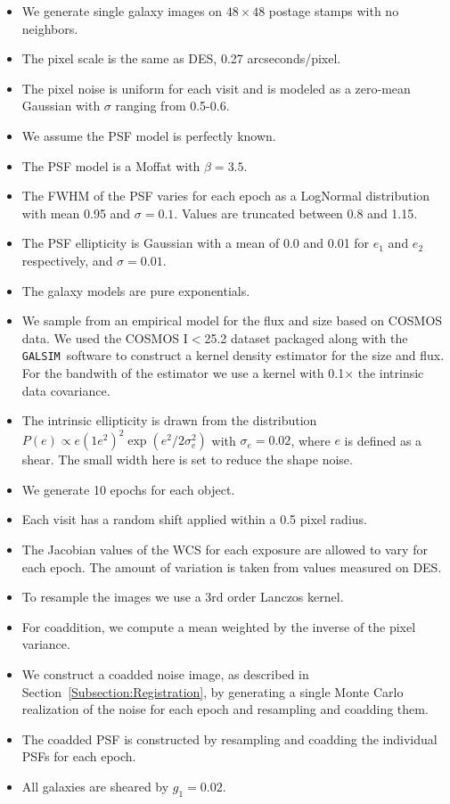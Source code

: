 \documentclass[fleqn,useAMS,usenatbib]{mnras}
\newcommand{\galsim}{\texttt{GALSIM}}
\begin{document}
\begin{itemize}
\setlength{\itemindent}{0in}
\item We generate single galaxy images on $48 \times 48$ postage stamps with no neighbors.
\item The pixel scale is the same as DES, 0.27 arcseconds/pixel.
\item The pixel noise is uniform for each visit and is modeled as a zero-mean Gaussian with $\sigma$ ranging from 0.5-0.6.
\item We assume the PSF model is perfectly known.
\item The PSF model is a Moffat with $\beta=3.5$.
\item The \textsf{FWHM} of the PSF varies for each epoch as a LogNormal distribution with mean 0.95 and $\sigma=0.1$.  Values are truncated between 0.8 and 1.15.
\item The PSF ellipticity is Gaussian with a mean of 0.0 and 0.01 for $e_1$ and $e_2$ respectively, and $\sigma=0.01$.
\item The galaxy models are pure exponentials.  
\item We sample from an empirical model for the flux and size based on \textsf{COSMOS} data.  We used the \textsf{COSMOS} I$<$25.2 dataset packaged along with the \galsim\ software to construct a kernel density estimator for the size and flux.  For the bandwith of the estimator we use a kernel with 0.1$\times$ the intrinsic data covariance.
\item The intrinsic ellipticity is drawn from the distribution $P(e) \propto e(1e^2)^2 \exp{(e^2/2\sigma_e^2)}$ with $\sigma_e=0.02$, where $e$ is defined as a shear.  The small width here is set to reduce the shape noise.
\item We generate 10 epochs for each object.  
\item Each visit has a random shift applied within a 0.5 pixel radius.
\item The Jacobian values of the WCS for each exposure are allowed to vary for each epoch.  The amount of variation is taken from values measured on DES.
\item To resample the images we use a 3rd order Lanczos kernel.
\item For coaddition, we compute a mean weighted by the inverse of the pixel variance.
\item We construct a coadded noise image, as described in Section~\ref{Subsection:Registration}, by generating a single Monte Carlo realization of the noise for each epoch and resampling and coadding them.
\item The coadded PSF is constructed by resampling and coadding the individual PSFs for each epoch.
\item All galaxies are sheared by $g_1=0.02$.

\end{itemize}
\end{document}
